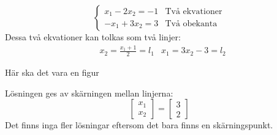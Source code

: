 \begin{Ex}
    \[
        \begin{cases}
        	x_1 - 2x_2 = -1 &\text{Två ekvationer}\\ 
        	-x_1 + 3x_2 = 3 &\text{Två obekanta}
        \end{cases}
    \]
    Dessa två ekvationer kan tolkas som två linjer:
    \begin{align*}
    &x_2 = \frac{x_1 + 1}{2} = l_1 & x_1 = 3x_2 -3 = l_2
    \end{align*}
    \begin{center}
    	Här ska det vara en figur
    \end{center}
    Lösningen ges av skärningen mellan linjerna:
    \[
        \begin{bmatrix} x_1\\x_2 \end{bmatrix} = \begin{bmatrix} 3\\2 \end{bmatrix}
    \]
    Det finns inga fler lösningar eftersom det bara finns en skärningspunkt.
\end{Ex}
